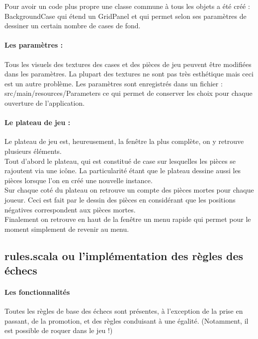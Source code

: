 \documentclass[a4paper]{article}
\begin{document}
Pour avoir un code plus propre une classe commune à tous les objets a été créé : BackgroundCase qui étend un GridPanel et qui permet selon ses paramètres de dessiner un certain nombre de cases de fond.

\paragraph{Les paramètres :}Tous les visuels des textures des cases et des pièces de jeu peuvent être modifiées dans les paramètres. La plupart des textures ne sont pas très esthétique mais ceci est un autre problème. Les paramètres sont enregistrés dans un fichier : src/main/resources/Parameters ce qui permet de conserver les choix pour chaque ouverture de l'application.

\paragraph{Le plateau de jeu :}Le plateau de jeu est, heureusement, la fenêtre la plus complète, on y retrouve plusieurs éléments. \\

Tout d'abord le plateau, qui est constitué de case sur lesquelles les pièces se rajoutent via une icône. La particularité étant que le plateau dessine aussi les pièces lorsque l'on en créé une nouvelle instance. \\

Sur chaque coté du plateau on retrouve un compte des pièces mortes pour chaque joueur. Ceci est fait par le dessin des pièces en considérant que les positions négatives correspondent aux pièces mortes. \\

Finalement on retrouve en haut de la fenêtre un menu rapide qui permet pour le moment simplement de revenir au menu.

\subsection{rules.scala ou l'implémentation des règles des échecs}

\paragraph{Les fonctionnalités} Toutes les règles de base des échecs sont présentes, à l'exception de la prise en passant, de la promotion, et des règles conduisant à une égalité. (Notamment, il est possible de roquer dans le jeu !)
\end{document}
